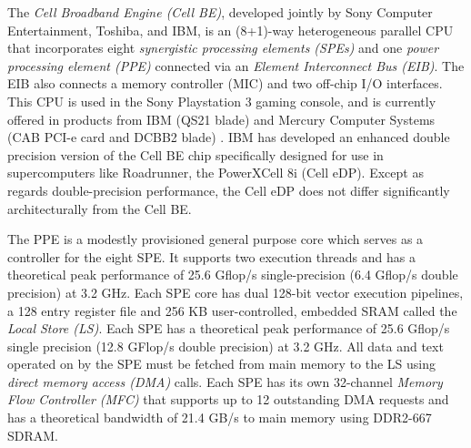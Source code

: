 \documentclass[journal,twoside]{IEEEtran}
\begin{document}

The \emph{Cell Broadband Engine (Cell BE)}, developed jointly by Sony
Computer Entertainment, Toshiba, and IBM, is an (8+1)-way
heterogeneous parallel CPU that incorporates eight
\emph{synergistic processing elements (SPEs)} and one
\emph{power processing element (PPE)} connected via an
\emph{Element Interconnect Bus (EIB)}.  The EIB also connects
a memory controller (MIC) and two off-chip I/O interfaces.  This CPU
is used in the Sony Playstation 3 gaming console, and is currently
offered in products from IBM (QS21 blade) and Mercury Computer Systems
(CAB PCI-e card and DCBB2 blade) \cite{mercury}.  IBM has developed an
enhanced double precision version of the Cell BE chip specifically
designed for use in supercomputers like Roadrunner, the PowerXCell 8i
(Cell eDP).  Except as regards double-precision performance, the Cell
eDP does not differ significantly architecturally from the Cell BE.

The PPE is a modestly provisioned general purpose core
which serves as a controller for the eight SPE.  It supports two
execution threads and has a theoretical peak performance of 25.6
Gflop/s single-precision (6.4 Gflop/s double precision) at 3.2 GHz.
Each SPE core has dual 128-bit vector execution pipelines, a 128 entry
register file and 256 KB user-controlled, embedded SRAM called the
\emph{Local Store (LS)}.  Each SPE has a theoretical peak performance
of 25.6 Gflop/s single precision (12.8 GFlop/s double precision) at
3.2 GHz.  All data and text operated on by the SPE must be fetched
from main memory to the LS using \emph{direct memory access (DMA)}
calls.  Each SPE has its own 32-channel
\emph{Memory Flow Controller (MFC)} that supports up to 12 outstanding
DMA requests and has a theoretical bandwidth of 21.4 GB/s to main
memory using DDR2-667 SDRAM.

\end{document}
